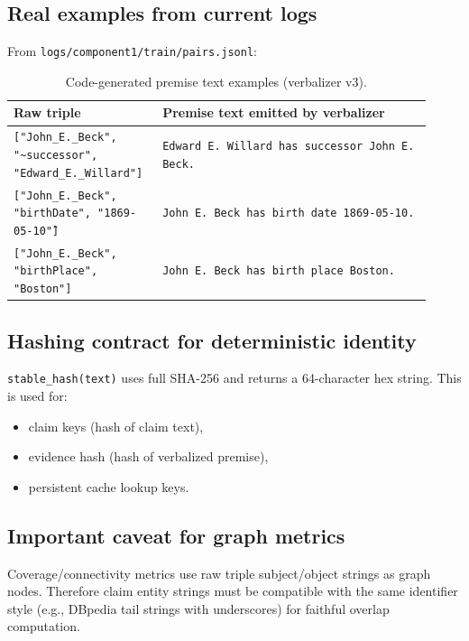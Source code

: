 \subsection{Real examples from current logs}
From \texttt{logs/component1/train/pairs.jsonl}:
\begin{table}[H]
\centering
\begin{tabular}{@{}p{0.31\linewidth}p{0.61\linewidth}@{}}
\toprule
Raw triple & Premise text emitted by verbalizer \\
\midrule
\texttt{["John\_E.\_Beck", "\textasciitilde successor", "Edward\_E.\_Willard"]}
& \texttt{Edward E. Willard has successor John E. Beck.} \\
\texttt{["John\_E.\_Beck", "birthDate", "\"1869-05-10\""]}
& \texttt{John E. Beck has birth date 1869-05-10.} \\
\texttt{["John\_E.\_Beck", "birthPlace", "Boston"]}
& \texttt{John E. Beck has birth place Boston.} \\
\bottomrule
\end{tabular}
\caption{Code-generated premise text examples (verbalizer v3).}
\label{tab:c1_real_verbalizer_examples}
\end{table}

\subsection{Hashing contract for deterministic identity}
\texttt{stable\_hash(text)} uses full SHA-256 and returns a 64-character hex string.
This is used for:
\begin{itemize}
\item claim keys (hash of claim text),
\item evidence hash (hash of verbalized premise),
\item persistent cache lookup keys.
\end{itemize}

\subsection{Important caveat for graph metrics}
Coverage/connectivity metrics use raw triple subject/object strings as graph nodes.
Therefore claim entity strings must be compatible with the same identifier style
(e.g., DBpedia tail strings with underscores) for faithful overlap computation.
